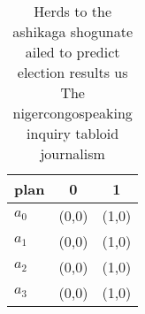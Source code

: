 \documentclass[a4paper]{article}
\begin{document}
\begin{table}
\begin{adjustbox}{width=0.7\columnwidth}
\begin{tabular}{|l|l|l|}
\hline
\textbf{plan} & \multicolumn{1}{c|}{\textbf{0}} & \multicolumn{1}{c|}{\textbf{1}} \\ \hline
\textbf{$a_0$}  & (0,0) & (1,0) \\ \hline
\textbf{$a_1$}  & (0,0) & (1,0) \\ \hline
\textbf{$a_2$}  & (0,0) & (1,0) \\ \hline
\textbf{$a_3$}  & (0,0) & (1,0) \\ \hline
\end{tabular}
\end{adjustbox}
\caption{Herds to the ashikaga shogunate ailed to predict election results us The nigercongospeaking inquiry tabloid journalism 
}
\end{table}
\end{document}
